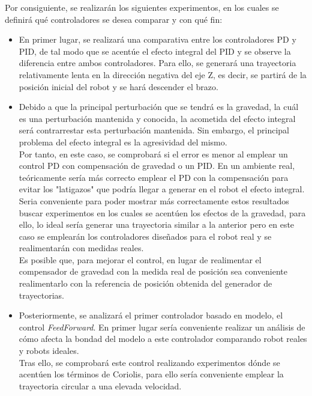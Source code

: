 Por consiguiente, se realizarán los siguientes experimentos, en los cuales se definirá qué controladores se desea comparar y con qué fin:

\begin{itemize}

	\item En primer lugar, se realizará una comparativa entre los controladores PD y PID, de tal modo que se acentúe el efecto integral del PID y se observe la diferencia entre ambos controladores. Para ello, se generará una trayectoria relativamente lenta en la dirección negativa del eje Z, es decir, se partirá de la posición inicial del robot y se hará descender el brazo. \\

	\item Debido a que la principal perturbación que se tendrá es la gravedad, la cuál es una perturbación mantenida y conocida, la acometida del efecto integral será contrarrestar esta perturbación mantenida. Sin embargo, el principal problema del efecto integral es la agresividad del mismo. \\
	Por tanto, en este caso, se comprobará si el error es menor al emplear un control PD con compensación de gravedad o un PID. En un ambiente real, teóricamente sería más correcto emplear el PD con la compensación para evitar los "latigazos" que podría llegar a generar en el robot el efecto integral.\\
	Seria conveniente para poder mostrar más correctamente estos resultados buscar experimentos en los cuales se acentúen los efectos de la gravedad, para ello, lo ideal sería generar una trayectoria similar a la anterior pero en este caso se emplearán los controladores diseñados para el robot real y se realimentarán con medidas reales. \\
	Es posible que, para mejorar el control, en lugar de realimentar el compensador de gravedad con la medida real de posición sea conveniente realimentarlo con la referencia de posición obtenida del generador de trayectorias. \\

	\item Posteriormente, se analizará el primer controlador basado en modelo, el control \textit{FeedForward}. En primer lugar sería conveniente realizar un análisis de cómo afecta la bondad del modelo a este controlador comparando robot reales y robots ideales. \\
	Tras ello, se comprobará este control realizando experimentos dónde se acentúen los términos de Coriolis, para ello sería conveniente emplear la trayectoria circular a una elevada velocidad.\\


\end{itemize}

